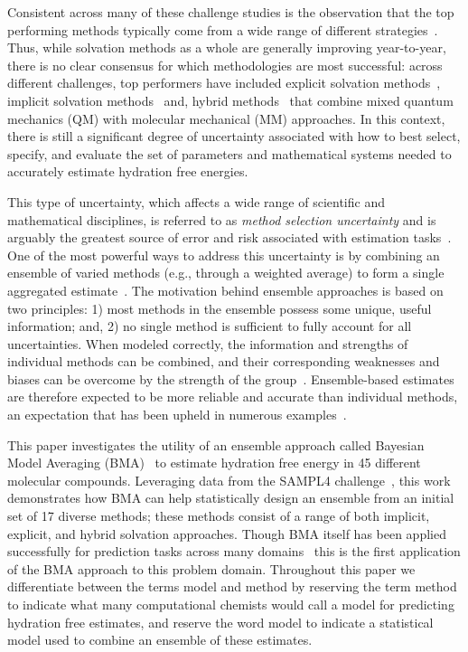 \documentclass[12pt]{article}
\newcommand{\+}[1]{\ensuremath{\mathbf{#1}}}
\begin{document}
Consistent across many of these challenge studies is the observation that the top performing methods typically come from a wide range of different strategies~\cite{Nicholls:2008, Mobley:2009b, Mobley:2009, Mobley:2014}.  Thus, while solvation methods as a whole are generally improving year-to-year, there is no clear consensus for which methodologies are most successful: across different challenges, top performers have included explicit solvation methods~\cite{Klimovich:2010, Levy:1998, Mobley:2009c}, implicit solvation methods~\cite{Mennucci:2007,Jorgensen:2004} and, hybrid methods~\cite{Konig:2014,Kamerlin:2009} that combine mixed quantum mechanics (QM) with molecular mechanical (MM) approaches.  In this context, there is still a significant degree of uncertainty associated with how to best select, specify, and evaluate the set of parameters and mathematical systems needed to accurately estimate hydration free energies.  

This type of uncertainty, which affects a wide range of scientific and mathematical disciplines, is referred to as \emph{method selection uncertainty} and is arguably the greatest source of error and risk associated with estimation tasks~\cite{Rojas:2010,Apostolakis:1990,Devooght:1998,Neuman:2003}.  One of the most powerful ways to address this uncertainty is by combining an ensemble of varied methods (e.g., through a weighted average) to form a single aggregated estimate~\cite{Bates:1969, Opitz:1999, Rokach:2010, Hoeting:1999}.  The motivation behind ensemble approaches is based on two principles: 1) most methods in the ensemble possess some unique, useful information; and, 2) no single method is sufficient to fully account for all uncertainties.   When modeled correctly, the information and strengths of individual methods can be combined, and their corresponding weaknesses and biases can be overcome by the strength of the group~\cite{Seni:2010, Hoeting:1999,Raftery:1998,Raftery:1995}.  Ensemble-based estimates are therefore expected to be more reliable and accurate than individual methods, an expectation that has been upheld in numerous examples~\cite{Gosink:2014, Zhang:2003, Bates:1969, Morales-Casique:2010, Opitz:1999, Rokach:2010, Hoeting:1999, Seni:2010, Raftery:2005, Vlachopoulo:2013}. 

This paper investigates the utility of an ensemble approach called Bayesian Model Averaging (BMA)~\cite{Hoeting:1999} to estimate hydration free energy in 45 different molecular compounds.  Leveraging data from the SAMPL4 challenge~\cite{Mobley:2014}, this work demonstrates how BMA can help statistically design an ensemble from an initial set of 17 diverse methods; these methods consist of a range of both implicit, explicit, and hybrid solvation approaches. Though BMA itself has been applied successfully for prediction tasks across many domains~\cite{Ye:2004,Vlachopoulo:2013,Raftery:2005,Morales-Casique:2010,Gosink:2014} this is the first application of the BMA approach to this problem domain.  Throughout this paper we differentiate between the terms model and method by reserving the term method to indicate what many computational chemists would call a model for predicting hydration free estimates, and reserve the word model to indicate a statistical model used to combine an ensemble of these estimates.
\end{document}
